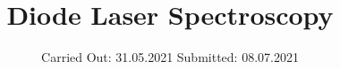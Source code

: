 



\subject{V60}  %
\title{Diode Laser Spectroscopy} %
\date{%
  Carried Out: 31.05.2021
  \hspace{3em}
  Submitted: 08.07.2021
}



\maketitle
\thispagestyle{empty}
\tableofcontents
\newpage




%
%

\printbibliography{}


